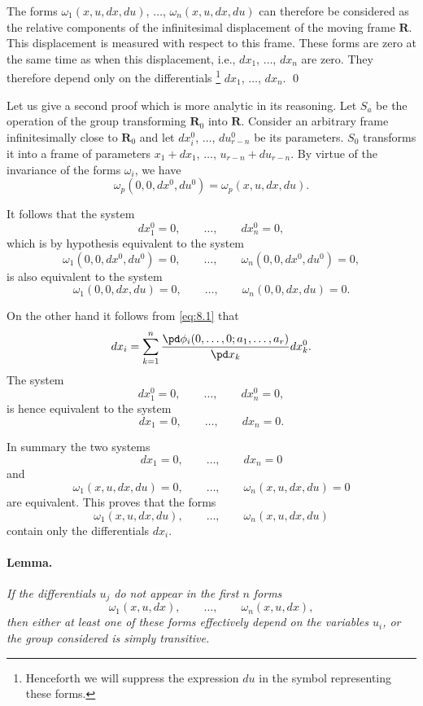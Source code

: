 The forms $\omega_{1}(x,u,dx,du)$, $\dots$, $\omega_{n}(x,u,dx,du)$ can therefore be considered as the relative components of the infinitesimal displacement of the moving frame $\mathbf{R}$. This displacement is measured with respect to this frame. These forms are zero at the same time as when this displacement, i.e., $dx_{1}$, $\dots$, $dx_{n}$ are zero.  They therefore depend only on the differentials \footnote{Henceforth we will suppress the expression $du$ in the symbol representing these forms.} $dx_{1}$, $\dots$, $dx_{n}$. \qed

\somespace

Let us give a second proof which is more analytic in its reasoning. Let $S_{a}$ be the operation of the group transforming $\mathbf{R}_{0}$ into $\mathbf{R}$. Consider an arbitrary frame infinitesimally close to $\mathbf{R}_{0}$ and let $dx_{i}^{0}$, $\dots$, $du^{0}_{r-n}$ be its parameters. $S_{0}$ transforms it into a frame of parameters $x_{1}+dx_{1}$, $\dots$, $u_{r-n}+du_{r-n}$. By virtue of the invariance of the forms $\omega_{i}$, we have
\[
\omega_{p}(0,0,dx^{0},du^{0})=\omega_{p}(x,u,dx,du).
\]

It follows that the system
\[
dx^{0}_{1}=0,\qquad\dots,\qquad dx_{n}^{0}=0,
\]
which is by hypothesis equivalent to the system
\[
\omega_{1}(0,0,dx^{0},du^{0})=0,\qquad\dots,\qquad \omega_{n}(0,0,dx^{0},du^{0})=0,
\]
is also equivalent to the system
\[
\omega_{1}(0,0,dx,du)=0,\qquad\dots,\qquad \omega_{n}(0,0,dx,du)=0.
\]

On the other hand it follows from \eqref{eq:8.1} that
\[
dx_{i}=\sum_{k=1}^{n}\frac{\pd \phi_{i}(0,\dots,0;a_{1},\dots,a_{r})}{\pd x_{k}}dx_{k}^{0}.
\]
The system
\[
dx^{0}_{1}=0,\qquad\dots,\qquad dx_{n}^{0}=0,
\]
is hence equivalent to the system
\[
dx_{1}=0,\qquad\dots,\qquad dx_{n}=0.
\]

In summary the two systems
\[
dx_{1}=0,\qquad\dots,\qquad dx_{n}=0
\]
and
\[
\omega_{1}(x,u,dx,du)=0,\qquad\dots,\qquad \omega_{n}(x,u,dx,du)=0
\]
are equivalent. This proves that the forms
\[
\omega_{1}(x,u,dx,du),\qquad\dots,\qquad \omega_{n}(x,u,dx,du)
\]
contain only the differentials $dx_{i}$.


\paragraph{Lemma.}
\label{sec:110}
\emph{If the differentials $u_{j}$ do not appear in the first $n$ forms}
\[
\omega_{1}(x,u,dx),\qquad\dots,\qquad \omega_{n}(x,u,dx),
\]
\emph{then either at least one of these forms effectively depend on the variables $u_{i}$, or the group considered is simply transitive.}

